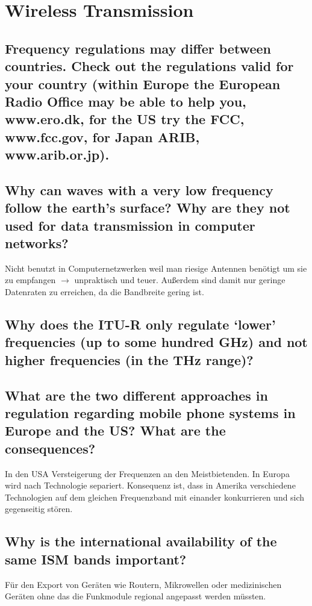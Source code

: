 \section{Wireless Transmission}

\subsection{Frequency regulations may differ between countries. Check out the regulations valid
for your country (within Europe the European Radio Office may be able to help you,
www.ero.dk, for the US try the FCC, www.fcc.gov, for Japan ARIB, www.arib.or.jp).}

\subsection{Why can waves with a very low frequency follow the earth’s surface? Why are they
not used for data transmission in computer networks?}
Nicht benutzt in Computernetzwerken weil man riesige Antennen benötigt um sie zu empfangen $\rightarrow$ unpraktisch und teuer. Außerdem sind damit nur geringe Datenraten zu erreichen, da die Bandbreite gering ist.

\subsection{Why does the ITU-R only regulate ‘lower’ frequencies (up to some hundred GHz) and
not higher frequencies (in the THz range)?}

\subsection{What are the two different approaches in regulation regarding mobile phone systems
in Europe and the US? What are the consequences?}
In den USA Versteigerung der Frequenzen an den Meistbietenden. In Europa wird nach Technologie separiert. Konsequenz ist, dass in Amerika verschiedene Technologien auf dem gleichen Frequenzband mit einander konkurrieren und sich gegenseitig stören.

\subsection{Why is the international availability of the same ISM bands important?}
Für den Export von Geräten wie Routern, Mikrowellen oder medizinischen Geräten ohne das die Funkmodule regional angepasst werden müssten.

